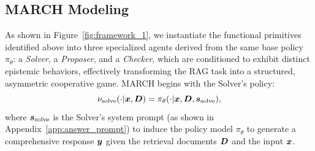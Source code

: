 \documentclass[10pt, a4paper, logo]{googledeepmind} %
\begin{document}
\subsection{MARCH Modeling}\label{met:modeling}

As shown in Figure~\ref{fig:framework_1}, we instantiate the functional primitives identified above into three specialized agents derived from the same base policy $\pi_\theta$: a \textit{Solver}, a \textit{Proposer}, and a \textit{Checker}, which are conditioned to exhibit distinct epistemic behaviors, effectively transforming the RAG task into a structured, asymmetric cooperative game. MARCH begins with the {Solver}'s policy:
\begin{equation}
   \nu_{\text{solve}}(\cdot | {\bm{x}}, {\bm{D}})  =  \pi_{\theta}(\cdot | {\bm{x}}, {\bm{D}},  {\bm{s}}_\text{solve}),
\end{equation} where ${\bm{s}}_\text{solve}$ is the Solver's system prompt (as shown in Appendix~\ref{app:answer_prompt}) to induce the policy model $\pi_\theta$ to generate a comprehensive response ${\bm{y}}$ given the retrieval documents ${\bm{D}}$ and the input ${\bm{x}}$.
\end{document}
